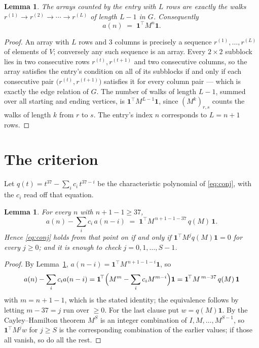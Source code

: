 \documentclass[11pt,a4paper]{article}
\theoremstyle{plain}
\newtheorem{lemma}[theorem]{Lemma}
\theoremstyle{definition}
\begin{document}
\begin{lemma}\label{lem:walk}
The arrays counted by the entry with $L$ rows are exactly the walks
$r^{(1)}\to r^{(2)}\to\cdots\to r^{(L)}$ of length $L-1$ in $G$. Consequently
\[
a(n)\;=\;\mathbf{1}^{\!\top}M^{n}\mathbf{1} .
\]
\end{lemma}

\begin{proof}
An array with $L$ rows and $3$ columns is precisely a sequence
$r^{(1)},\dots,r^{(L)}$ of elements of $V$; conversely any such sequence is an array.
Every $2\times2$ subblock lies in two consecutive rows $r^{(t)},r^{(t+1)}$ and two
consecutive columns, so the array satisfies the entry's condition on all of its subblocks
if and only if each consecutive pair $\bigl(r^{(t)},r^{(t+1)}\bigr)$ satisfies it for
every column pair --- which is exactly the edge relation of $G$. The number of walks of
length $L-1$, summed over all starting and ending vertices, is
$\mathbf{1}^{\!\top}M^{L-1}\mathbf{1}$, since $(M^{k})_{r,s}$ counts the walks of
length $k$ from $r$ to $s$. The entry's index $n$ corresponds to $L=n+1$ rows.
\end{proof}

\section{The criterion}

Let $q(t)=t^{37}-\sum_i c_i\,t^{37-i}$ be the characteristic polynomial of
\eqref{eq:conj}, with the $c_i$ read off that equation.

\begin{lemma}\label{lem:crit}
For every $n$ with $n+1-1\ge37$,
\[
a(n)-\sum_i c_i\,a(n-i)\;=\;\mathbf{1}^{\!\top}M^{\,n+1-1-37}\,q(M)\,\mathbf{1} .
\]
Hence \eqref{eq:conj} holds from that point on if and only if
$\mathbf{1}^{\!\top}M^{j}q(M)\mathbf{1}=0$ for every $j\ge0$; and it is enough to check
$j=0,1,\dots,S-1$.
\end{lemma}

\begin{proof}
By Lemma~\ref{lem:walk}, $a(n-i)=\mathbf{1}^{\!\top}M^{\,n+1-1-i}\mathbf{1}$, so
\[
a(n)-\sum_i c_i a(n-i)
=\mathbf{1}^{\!\top}\Bigl(M^{m}-\sum_i c_i M^{m-i}\Bigr)\mathbf{1}
=\mathbf{1}^{\!\top}M^{\,m-37}\,q(M)\,\mathbf{1}
\]
with $m=n+1-1$, which is the stated identity; the equivalence follows by letting
$m-37=j$ run over $\ge0$. For the last clause put $w=q(M)\mathbf{1}$. By the
Cayley--Hamilton theorem $M^{S}$ is an integer combination of $I,M,\dots,M^{S-1}$, so
$\mathbf{1}^{\!\top}M^{j}w$ for $j\ge S$ is the corresponding combination of the earlier
values; if those all vanish, so do all the rest.
\end{proof}
\end{document}
